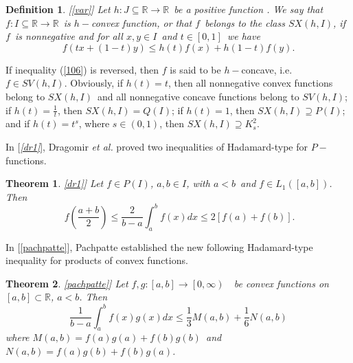 \documentclass{amsart}
\newtheorem{theorem}{Theorem}
\theoremstyle{plain}
\newtheorem{definition}{Definition}
\numberwithin{equation}{section}
\begin{document}
\begin{definition}
\bigskip \textit{[\ref{var}] Let }$h:J\subseteq 
\mathbb{R}
\rightarrow 
\mathbb{R}
$\textit{\ be a positive function . We say that }$f:I\subseteq 
\mathbb{R}
\rightarrow 
\mathbb{R}
$\textit{\ is }$h-$\textit{convex function, or that }$f$\textit{\ belongs to
the class }$SX\left( h,I\right) $\textit{, if }$f$\textit{\ is nonnegative
and for all }$x,y\in I$\textit{\ and }$t\in \left[ 0,1\right] $\textit{\ we
have \ \ \ \ \ \ \ \ \ \ \ \ }\begin{equation}
f\left( tx+\left( 1-t\right) y\right) \leq h\left( t\right) f\left( x\right)
+h\left( 1-t\right) f\left( y\right) .  \label{106}
\end{equation}
\end{definition}

If inequality (\ref{106}) is reversed, then $f$ is said to be $h-$concave,
i.e. $f\in SV\left( h,I\right) $. Obviously, if $h\left( t\right) =t$, then
all nonnegative convex functions belong to $SX\left( h,I\right) $\ and all
nonnegative concave functions belong to $SV\left( h,I\right) $; if $h\left(
t\right) =\frac{1}{t}$, then $SX\left( h,I\right) =Q\left( I\right) $; if $h\left( t\right) =1$, then $SX\left( h,I\right) \supseteq P\left( I\right) $; and if $h\left( t\right) =t^{s}$, where $s\in \left( 0,1\right) $, then $SX\left( h,I\right) \supseteq K_{s}^{2}$.

In [\textit{\ref{dr1}}], Dragomir \textit{et al.} proved two inequalities of
Hadamard-type for $P-$functions.

\begin{theorem}
\lbrack \textit{\ref{dr1}] Let }$f\in P\left( I\right) $\textit{, }$a,b\in I$\textit{, with }$a<b$\textit{\ and }$f\in L_{1}\left( \left[ a,b\right]
\right) $\textit{. Then} \ \ \ \ \ \ \ \ \ \ \ 
\begin{equation}
\ f\left( \frac{a+b}{2}\right) \leq \frac{2}{b-a}\int_{a}^{b}f\left(
x\right) dx\leq 2\left[ f\left( a\right) +f\left( b\right) \right] .
\label{107}
\end{equation}
\end{theorem}

In [\ref{pachpatte}], Pachpatte established the new following Hadamard-type
inequality for products of convex functions.

\begin{theorem}
\lbrack \ref{pachpatte}] \textit{Let }$f,g:\left[ a,b\right] \rightarrow \left[ 0,\infty \right) $\textit{\ \ be convex functions on }$\left[ a,b\right] \subset 
\mathbb{R}
$\textit{, }$a<b$\textit{. Then } \ \ \ \ \ \ \ \ \ \ \ 
\begin{equation}
\frac{1}{b-a}\int_{a}^{b}f\left( x\right) g\left( x\right) dx\leq \frac{1}{3}M\left( a,b\right) +\frac{1}{6}N\left( a,b\right)  \label{108}
\end{equation}\textit{where }$M\left( a,b\right) =f\left( a\right) g\left( a\right)
+f\left( b\right) g\left( b\right) $\textit{\ and }$N\left( a,b\right)
=f\left( a\right) g\left( b\right) +f\left( b\right) g\left( a\right) $\textit{.}\bigskip
\end{theorem}
\end{document}
